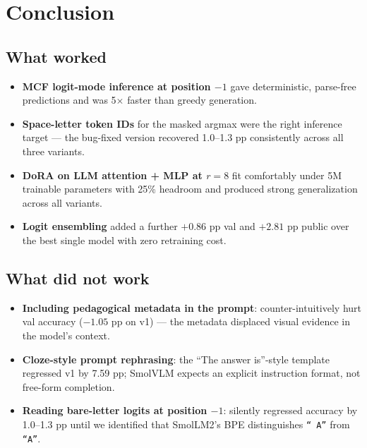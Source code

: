 \documentclass[11pt]{article}
\begin{document}
\section{Conclusion}

\subsection{What worked}

\begin{itemize}
    \item \textbf{MCF logit-mode inference at position $-1$} gave deterministic, parse-free predictions and was 5$\times$ faster than greedy generation.
    \item \textbf{Space-letter token IDs} for the masked argmax were the right inference target --- the bug-fixed version recovered 1.0--1.3 pp consistently across all three variants.
    \item \textbf{DoRA on LLM attention + MLP at $r=8$} fit comfortably under 5M trainable parameters with 25\% headroom and produced strong generalization across all variants.
    \item \textbf{Logit ensembling} added a further $+0.86$ pp val and $+2.81$ pp public over the best single model with zero retraining cost.
\end{itemize}

\subsection{What did not work}

\begin{itemize}
    \item \textbf{Including pedagogical metadata in the prompt}: counter-intuitively hurt val accuracy ($-1.05$ pp on v1) --- the metadata displaced visual evidence in the model's context.
    \item \textbf{Cloze-style prompt rephrasing}: the ``The answer is''-style template regressed v1 by 7.59 pp; SmolVLM expects an explicit instruction format, not free-form completion.
    \item \textbf{Reading bare-letter logits at position $-1$}: silently regressed accuracy by 1.0--1.3 pp until we identified that SmolLM2's BPE distinguishes \texttt{`` A''} from \texttt{``A''}.
\end{itemize}
\end{document}
